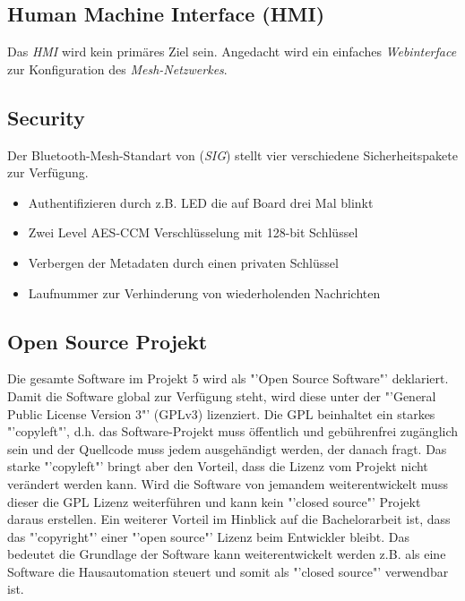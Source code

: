 \subsection{Human Machine Interface (HMI)}\label{subsec:HMI_SW}
Das \textit{HMI} wird kein primäres Ziel sein. Angedacht wird ein einfaches \textit{Webinterface} zur Konfiguration des \textit{Mesh-Netzwerkes}.

\subsection{Security}\label{subsec:Security}
Der Bluetooth-Mesh-Standart von (\textit{SIG}) stellt vier verschiedene Sicherheitspakete zur Verfügung.\cite{nordic_semiconductor_nordic_2019} 

 \begin{itemize} 
 	\item Authentifizieren durch z.B. LED die auf Board drei Mal blinkt 
 	\item Zwei Level AES-CCM Verschlüsselung mit 128-bit Schlüssel
 	\item Verbergen der Metadaten durch einen privaten Schlüssel
 	\item Laufnummer zur Verhinderung von wiederholenden Nachrichten   
 \end{itemize}


\subsection{Open Source Projekt}\label{subsec:OSP}
Die gesamte Software im Projekt 5 wird als "'Open Source Software"' deklariert. Damit die Software global zur Verfügung steht, wird diese unter der "'General Public License Version 3"' (GPLv3) lizenziert. Die GPL beinhaltet ein starkes "'copyleft"', d.h. das Software-Projekt muss öffentlich und gebührenfrei zugänglich sein und der Quellcode muss jedem ausgehändigt werden, der danach fragt. Das starke "'copyleft"' bringt aber den Vorteil, dass die Lizenz vom Projekt nicht verändert werden kann. Wird die Software von jemandem weiterentwickelt muss dieser die GPL Lizenz weiterführen und kann kein "'closed source"' Projekt daraus erstellen. Ein weiterer Vorteil im Hinblick auf die Bachelorarbeit ist, dass das "'copyright"' einer "'open source"' Lizenz beim Entwickler bleibt. Das bedeutet die Grundlage der Software kann weiterentwickelt werden z.B. als eine Software die Hausautomation steuert und somit als "'closed source"' verwendbar ist.\cite{jaeger_was_2018}


